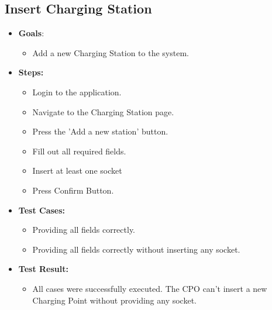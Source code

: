 \documentclass{Configuration_Files/PoliMi3i_thesis}
\begin{document}
\subsection{Insert Charging Station}
\begin{itemize}
    \item\textbf{Goals}:
        \begin{itemize}
            \item Add a new Charging Station to the system. 
        \end{itemize}
    \item \textbf{Steps:}
        \begin{itemize}
            \item Login to the application.
            \item Navigate to the Charging Station page. 
            \item Press the 'Add a new station' button. 
            \item Fill out all required fields.
            \item Insert at least one socket  
            \item Press Confirm Button. 
        \end{itemize}
    \item \textbf{Test Cases:}
        \begin{itemize}
            \item Providing all fields correctly. 
            \item Providing all fields correctly without inserting any socket. 
        \end{itemize}
    \item\textbf{Test Result:}
        \begin{itemize}
            \item All cases were successfully executed. The CPO can't insert a new Charging Point without providing any socket. 
        \end{itemize}
\end{itemize}
\end{document}
